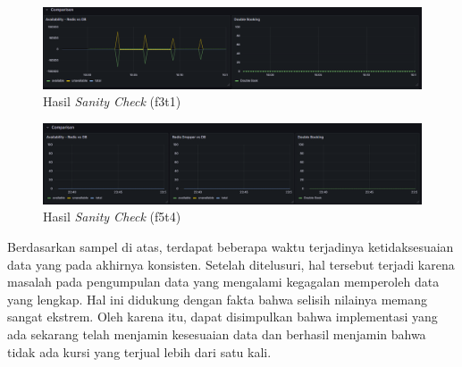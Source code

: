 \begin{figure}[htbp]
    \centering
    \includegraphics[width=1\textwidth]{resources/chapter-4/sanity-f3t1.png}
    \caption{Hasil \textit{Sanity Check} (f3t1)}
    \label{fig:sanity-f3t1}
\end{figure}

\begin{figure}[htbp]
    \centering
    \includegraphics[width=1\textwidth]{resources/chapter-4/sanity-f5t4.png}
    \caption{Hasil \textit{Sanity Check} (f5t4)}
    \label{fig:sanity-f5t4}
\end{figure}

Berdasarkan sampel di atas, terdapat beberapa waktu terjadinya ketidaksesuaian data yang pada akhirnya konsisten. Setelah ditelusuri, hal tersebut terjadi karena masalah pada pengumpulan data yang mengalami kegagalan memperoleh data yang lengkap. Hal ini didukung dengan fakta bahwa selisih nilainya memang sangat ekstrem. Oleh karena itu, dapat disimpulkan bahwa implementasi yang ada sekarang telah menjamin kesesuaian data dan berhasil menjamin bahwa tidak ada kursi yang terjual lebih dari satu kali.
